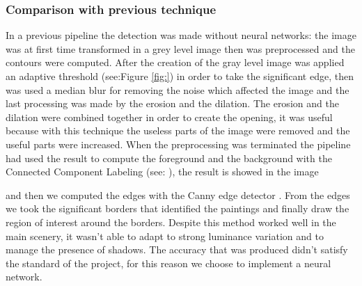 \subsubsection{Comparison with previous technique}
In a previous pipeline the detection was made without neural networks:
the image was at first time transformed in a grey level image then was preprocessed and the contours were computed. After the creation of the gray level image was applied an adaptive threshold (see:Figure \ref{fig:}) in order to take the significant edge, then was used a median blur for removing the noise which affected the image and the last processing was made by the erosion and the dilation.
The erosion and the dilation were combined together in order to create the opening, it was useful because with this technique the useless parts of the image were removed and the useful parts were increased. 
When the preprocessing was terminated the pipeline had used the result to compute the foreground and the background with the Connected Component Labeling (see: \cite{Grana_ccl}), the result is showed in the image 



and then we computed the edges with the Canny edge detector \cite{canny}. From the edges we took the significant borders that identified the paintings and finally draw the region of interest around the borders. Despite this method worked well in the main scenery, it wasn't able to adapt to strong luminance variation and to manage the presence of shadows.
The accuracy that was produced didn't satisfy the standard of the project, for this reason we choose to implement a neural network.


